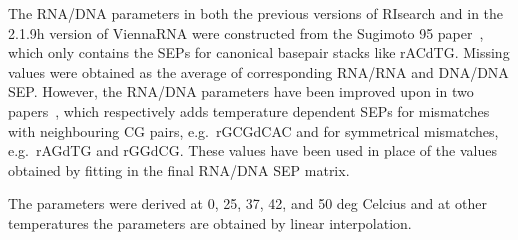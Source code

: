 \documentclass[11pt]{article}
\begin{document}
The RNA/DNA parameters in both the previous versions of RIsearch and in the 2.1.9h version of ViennaRNA were constructed from the Sugimoto 95 paper~\citep{sugimoto1995rnadna}, which only contains the SEPs for canonical basepair stacks like rACdTG.
Missing values were obtained as the average of corresponding RNA/RNA and DNA/DNA SEP.
However, the RNA/DNA parameters have been improved upon in two papers~\citep{sugimoto2000thermodynamics,watkins2011thermodynamic}, which respectively adds temperature dependent SEPs for mismatches with neighbouring CG pairs, e.g.\ rGCGdCAC and for symmetrical mismatches, e.g.\ rAGdTG and rGGdCG.
These values have been used in place of the values obtained by fitting in the final RNA/DNA SEP matrix.

 The parameters were derived at 0, 25, 37, 42, and 50 deg Celcius and at other temperatures the parameters are obtained by linear interpolation.



\end{document}
